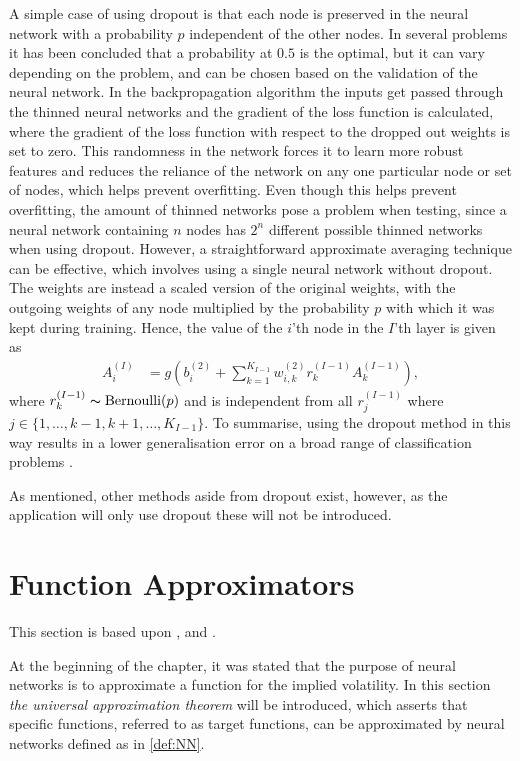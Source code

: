 A simple case of using dropout is that each node is preserved in the neural network with a probability $p$ independent of the other nodes. In several problems it has been concluded that a probability at $0.5$ is the optimal, but it can vary depending on the problem, and can be chosen based on the validation of the neural network. In the backpropagation algorithm the inputs get passed through the thinned neural networks and the gradient of the loss function is calculated, where the gradient of the loss function with respect to the dropped out weights is set to zero. This randomness in the network forces it to learn more robust features and reduces the reliance of the network on any one particular node or set of nodes, which helps prevent overfitting. Even though this helps prevent overfitting, the amount of thinned networks pose a problem when testing, since a neural network containing $n$ nodes has $2^n$ different possible thinned networks when using dropout. However, a straightforward approximate averaging technique can be effective, which involves using a single neural network without dropout. The weights are instead a scaled version of the original weights, with the outgoing weights of any node multiplied by the probability $p$ with which it was kept during training. Hence, the value of the $i$'th node in the $I$'th layer is given as
\begin{align*}
    A^{(I)}_i &= g\left(b_{i}^{(2)} + \sum_{k=1}^{K_{I-1}} w_{i,k}^{(2)}r_{k}^{(I-1)}A_{k}^{(I-1)}\right),
\end{align*}
where $r_{k}^{(I-1)} \thicksim \operatorname{Bernoulli}(p)$ and is independent from all $r_{j}^{(I-1)}$ where $j\in \{1,\ldots, k-1,k+1, \ldots, K_{I-1}\}$. To summarise, using the dropout method in this way results in a lower generalisation error on a broad range of classification problems \citep{Dropout}.

As mentioned, other methods aside from dropout exist, however, as the application will only use dropout these will not be introduced.

\section{Function Approximators}\label{sec:UAT}
This section is based upon \citep[p. 16-17]{Art}, \citep{Barron} and \citep{REOS}.

At the beginning of the chapter, it was stated that the purpose of neural networks is to approximate a function for the implied volatility. In this section \emph{the universal approximation theorem} will be introduced, which asserts that specific functions, referred to as target functions, can be approximated by neural networks defined as in \autoref{def:NN}. 


